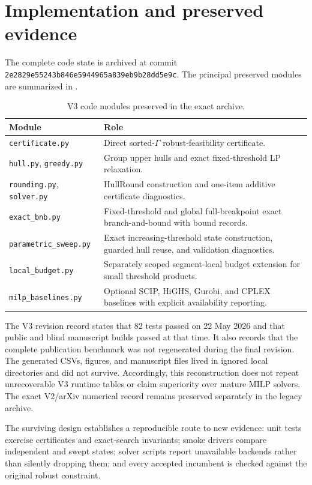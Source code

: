 \documentclass[11pt,a4paper]{article}
\theoremstyle{definition}
\theoremstyle{remark}
\begin{document}
\section{Implementation and preserved evidence}

The complete code state is archived at commit
\texttt{2e2829e55243b846e5944965a839eb9b28dd5e9c}. The principal preserved
modules are summarized in .

\begin{table}[htbp]
\centering
\caption{V3 code modules preserved in the exact archive.}
\label{tab:modules}
\small
\begin{tabular}{p{}p{}}
\toprule
Module & Role \\
\midrule
\texttt{certificate.py} & Direct sorted-$\Gamma$ robust-feasibility certificate. \\
\texttt{hull.py}, \texttt{greedy.py} & Group upper hulls and exact fixed-threshold LP relaxation. \\
\texttt{rounding.py}, \texttt{solver.py} & HullRound construction and one-item additive certificate diagnostics. \\
\texttt{exact\_bnb.py} & Fixed-threshold and global full-breakpoint exact branch-and-bound with bound records. \\
\texttt{parametric\_sweep.py} & Exact increasing-threshold state construction, guarded hull reuse, and validation diagnostics. \\
\texttt{local\_budget.py} & Separately scoped segment-local budget extension for small threshold products. \\
\texttt{milp\_baselines.py} & Optional SCIP, HiGHS, Gurobi, and CPLEX baselines with explicit availability reporting. \\
\bottomrule
\end{tabular}
\end{table}

The V3 revision record states that 82 tests passed on 22 May 2026 and that
public and blind manuscript builds passed at that time. It also records that
the complete publication benchmark was not regenerated during the final
revision. The generated CSVs, figures, and manuscript files lived in ignored
local directories and did not survive. Accordingly, this reconstruction does
not repeat unrecoverable V3 runtime tables or claim superiority over mature
MILP solvers. The exact V2/arXiv numerical record remains preserved separately
in the legacy archive.

The surviving design establishes a reproducible route to new evidence:
unit tests exercise certificates and exact-search invariants; smoke drivers
compare independent and swept states; solver scripts report unavailable
backends rather than silently dropping them; and every accepted incumbent is
checked against the original robust constraint.
\end{document}
